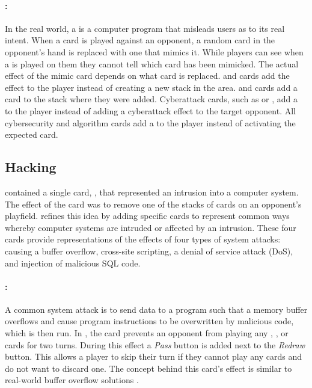 \paragraph{\Trjns:}
In the real world, a \Trj is a computer program that misleads users as to its real intent. When a \Trj card is played against an opponent, a random card in the opponent's hand is replaced with one that mimics it. While players can see when a \Trj is played on them they cannot tell which card has been mimicked. The actual effect of the mimic card depends on what card is replaced. \I and \M cards add the \Buf effect to the player instead of creating a new stack in the \Play area. \R and \V cards add a \Vi card to the stack where they were added. Cyberattack cards, such as \DoS or \Vins, add a \CSS to the player instead of adding a cyberattack effect to the target opponent. All cybersecurity and algorithm cards add a \Ran to the player instead of activating the expected card.

\subsection{Hacking}
\label{section:hacking}
\pwOne contained a single card, \Hackns, that represented an intrusion into a computer system. The effect of the \Hack card was to remove one of the stacks of cards on an opponent's playfield. \pwTwo refines this idea by adding specific cards to represent common ways whereby computer systems are intruded or affected by an intrusion. These four cards provide representations of the effects of four types of system attacks: causing a buffer overflow, cross-site scripting, a denial of service attack (DoS), and injection of malicious SQL code.

\paragraph{\Bufns:}
A common system attack is to send data to a program such that a memory buffer overflows and cause program instructions to be overwritten by malicious code, which is then run. In \pwTwoNS, the \Buf card prevents an opponent from playing any \Ins, \Rns, \V or \M cards for two turns. During this effect a \emph{Pass} button is added next to the \emph{Redraw} button. This allows a player to skip their turn if they cannot play any cards and do not want to discard one. The concept behind this card's effect is similar to real-world buffer overflow solutions \cite{libsafe, StackGuard}.

